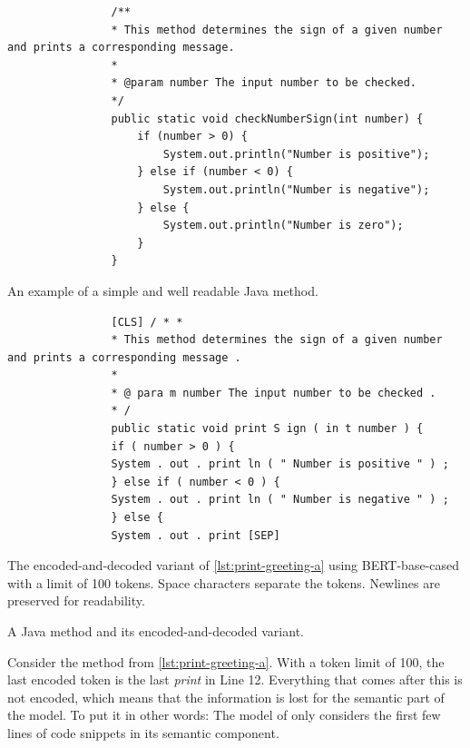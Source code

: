 \documentclass[%
class=scrreprt,
chapterprefix=false,%
open=right,%
twoside=false,%
paper=a4,%
logofile={Logo\_zentral\_farbig\_EN.png},%
thesistype=master,%
UKenglish,%
]{se2thesis}
\theoremstyle{definition}
\begin{document}
	\begin{listing}[p]
		\begin{sublisting}{\linewidth}
			\begin{verbatim}
				/**
				* This method determines the sign of a given number and prints a corresponding message.
				*
				* @param number The input number to be checked.
				*/
				public static void checkNumberSign(int number) {
					if (number > 0) {
						System.out.println("Number is positive");
					} else if (number < 0) {
						System.out.println("Number is negative");
					} else {
						System.out.println("Number is zero");
					}
				}
			\end{verbatim}
			\caption{An example of a simple and well readable Java method.}
			\label{lst:print-greeting-a}
		\end{sublisting}
		\vspace{1pt}
		
		\begin{sublisting}{\linewidth}
			\begin{verbatim}
				[CLS] / * *
				* This method determines the sign of a given number and prints a corresponding message .
				*
				* @ para m number The input number to be checked .
				* /
				public static void print S ign ( in t number ) {
				if ( number > 0 ) {
				System . out . print ln ( " Number is positive " ) ;
				} else if ( number < 0 ) {
				System . out . print ln ( " Number is negative " ) ;
				} else {
				System . out . print [SEP]
			\end{verbatim}
			\caption{The encoded-and-decoded variant of \autoref{lst:print-greeting-a} using BERT-base-cased with a limit of 100 tokens. Space characters separate the tokens. Newlines are preserved for readability.}
			\label{lst:print-greeting-b}
		\end{sublisting}
		\caption{A Java method and its encoded-and-decoded variant.}
		\label{lst:print-greeting}
	\end{listing}
	
	Consider the method from \autoref{lst:print-greeting-a}. With a token limit of 100, the last encoded token is the last \textit{print} in Line 12. Everything that comes after this is not encoded, which means that the information is lost for the semantic part of the model. To put it in other words: The model of \citeauthor{mi2022towards} only considers the first few lines of code snippets in its semantic component.
	
\end{document}
